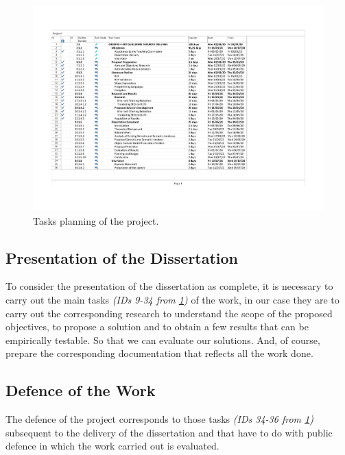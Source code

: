 \begin{figure}
    \includegraphics[width=\textwidth]{images/planificacion.pdf}
    \centering
	\caption[Tasks planning of the project]{Tasks planning of the project.}
    \label{fig:planning-sheet}
\end{figure}

\subsection{Presentation of the Dissertation}
To consider the presentation of the dissertation as complete, it is necessary to carry out the main
tasks \textit{(IDs 9-34 from \cref{fig:planning-sheet})} of the work, in our case they are to
carry out the corresponding research to understand the scope of the proposed objectives, to propose a
solution and to obtain a few results that can be empirically testable. So that we can evaluate our
solutions. And, of course, prepare the corresponding documentation that reflects all the work done.

\subsection{Defence of the Work}
The defence of the project corresponds to those tasks \textit{(IDs 34-36 from \cref{fig:planning-sheet})}
subsequent to the delivery of the dissertation and that have to do with public defence in which the work carried out is evaluated.

